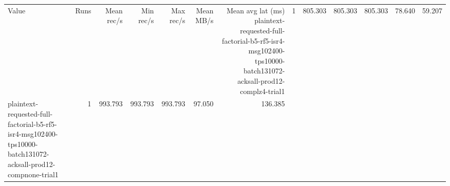 \begin{tabular}{lrrrrrr}
\hline
Value & Runs & Mean rec/s & Min rec/s & Max rec/s & Mean MB/s & Mean avg lat (ms) \
\hline
plaintext-requested-full-factorial-b5-rf5-isr4-msg102400-tps10000-batch131072-acksall-prod12-complz4-trial1 & 1 & 805.303 & 805.303 & 805.303 & 78.640 & 59.207 \\
plaintext-requested-full-factorial-b5-rf5-isr4-msg102400-tps10000-batch131072-acksall-prod12-compnone-trial1 & 1 & 993.793 & 993.793 & 993.793 & 97.050 & 136.385 \\
\hline
\end{tabular}
